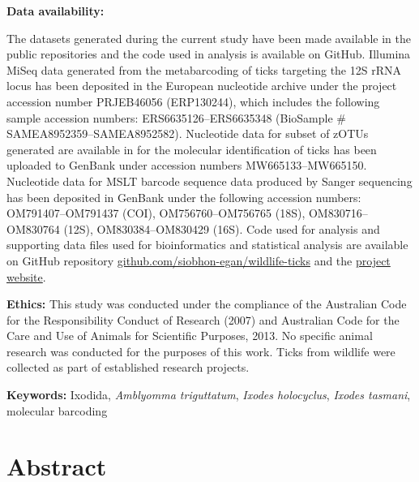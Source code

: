 \documentclass[a4paper, nobind]{templates/ociamthesis}
\begin{document}
\vspace{5mm}

\textbf{Data availability:}

The datasets generated during the current study have been made available in the public repositories and the code used in analysis is available on GitHub.
Illumina MiSeq data generated from the metabarcoding of ticks targeting the 12S rRNA locus has been deposited in the European nucleotide archive under the project accession number PRJEB46056 (ERP130244), which includes the following sample accession numbers: ERS6635126--ERS6635348 (BioSample \# SAMEA8952359--SAMEA8952582).
Nucleotide data for subset of zOTUs generated are available in for the molecular identification of ticks has been uploaded to GenBank under accession numbers MW665133--MW665150.
Nucleotide data for MSLT barcode sequence data produced by Sanger sequencing has been deposited in GenBank under the following accession numbers: OM791407--OM791437 (COI), OM756760--OM756765 (18S), OM830716--OM830764 (12S), OM830384--OM830429 (16S).
Code used for analysis and supporting data files used for bioinformatics and statistical analysis are available on GitHub repository \href{https://github.com/siobhon-egan/wildlife-ticks}{github.com/siobhon-egan/wildlife-ticks} and the \href{https://siobhonlegan.com/wildlife-ticks/}{project website}.

\vspace{5mm}

\textbf{Ethics:}
This study was conducted under the compliance of the Australian Code for the Responsibility Conduct of Research (2007) and Australian Code for the Care and Use of Animals for Scientific Purposes, 2013.
No specific animal research was conducted for the purposes of this work. Ticks from wildlife were collected as part of established research projects.

\textbf{Keywords:} Ixodida, \emph{Amblyomma triguttatum}, \emph{Ixodes holocyclus}, \emph{Ixodes tasmani}, molecular barcoding

\newpage

\hypertarget{abstract}{%
\section{Abstract}\label{abstract}}
\end{document}
